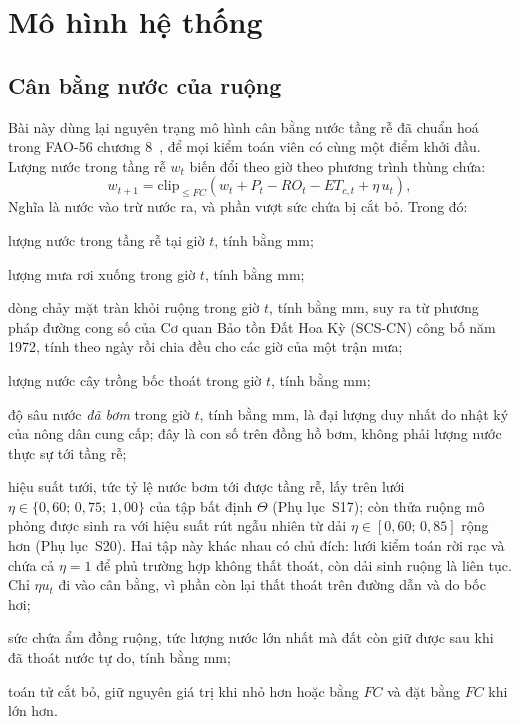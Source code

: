 \section{Mô hình hệ thống}
\label{sec:model}

\subsection{Cân bằng nước của ruộng}

Bài này dùng lại nguyên trạng mô hình cân bằng nước tầng rễ đã chuẩn hoá trong
FAO-56 chương 8~\cite{fao56}, để mọi kiểm toán viên có cùng một điểm khởi đầu.
Lượng nước trong tầng rễ $w_t$ biến đổi theo giờ theo phương trình thùng chứa:
\begin{equation}
w_{t+1}=\mathrm{clip}_{\le FC}\!\left(w_t+P_t-RO_t-ET_{c,t}+\eta\,u_t\right),
\label{eq:bucket}
\end{equation}
Nghĩa là nước vào trừ nước ra, và phần vượt sức chứa bị cắt bỏ. Trong đó:
\begin{symbolist}
\item[$w_t$] lượng nước trong tầng rễ tại giờ $t$, tính bằng mm;
\item[$P_t$] lượng mưa rơi xuống trong giờ $t$, tính bằng mm;
\item[$RO_t$] dòng chảy mặt tràn khỏi ruộng trong giờ $t$, tính bằng mm, suy ra từ phương pháp đường cong số của Cơ quan Bảo tồn Đất Hoa Kỳ (SCS-CN) công bố năm 1972, tính theo ngày rồi chia đều
  cho các giờ của một trận mưa;
\item[$ET_{c,t}$] lượng nước cây trồng bốc thoát trong giờ $t$, tính bằng mm;
\item[$u_t$] độ sâu nước \emph{đã bơm} trong giờ $t$, tính bằng mm, là đại lượng
  duy nhất do nhật ký của nông dân cung cấp; đây là con số trên đồng hồ bơm,
  không phải lượng nước thực sự tới tầng rễ;
\item[$\eta$] hiệu suất tưới, tức tỷ lệ nước bơm tới được tầng rễ,
  lấy trên lưới $\eta\in\{0{,}60;\,0{,}75;\,1{,}00\}$ của tập bất định
  $\Theta$ (Phụ lục~S17); còn thửa ruộng mô phỏng được sinh ra với hiệu suất rút
  ngẫu nhiên từ dải $\eta\in[0{,}60;\,0{,}85]$ rộng hơn (Phụ lục~S20). Hai tập
  này khác nhau có chủ đích: lưới kiểm toán rời rạc và chứa cả $\eta=1$ để phủ
  trường hợp không thất thoát, còn dải sinh ruộng là liên tục. Chỉ $\eta u_t$ đi
  vào cân bằng, vì phần còn lại thất thoát trên đường dẫn và do bốc hơi;
\item[$FC$] sức chứa ẩm đồng ruộng, tức lượng nước lớn nhất mà đất còn giữ được
  sau khi đã thoát nước tự do, tính bằng mm;
\item[$\mathrm{clip}_{\le FC}$] toán tử cắt bỏ, giữ nguyên giá trị khi nhỏ hơn
  hoặc bằng $FC$ và đặt bằng $FC$ khi lớn hơn.
\end{symbolist}

